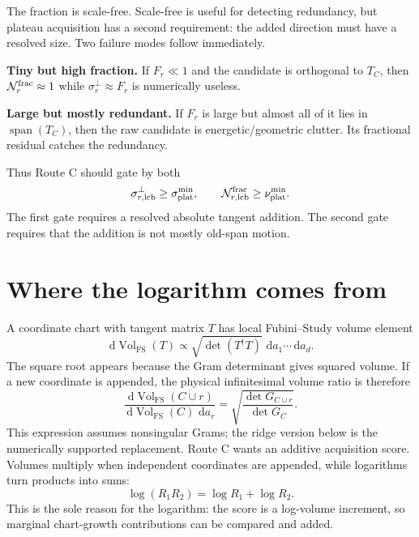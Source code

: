 \documentclass[10pt,twocolumn]{article}
\newcommand{\Span}{\operatorname{span}}
\newcommand{\lcb}{\mathrm{lcb}}
\newcommand{\plat}{\mathrm{plat}}
\newcommand{\FS}{\mathrm{FS}}
\newcommand{\dd}{\,\mathrm d}
\begin{document}
The fraction is scale-free. Scale-free is useful for detecting redundancy, but
plateau acquisition has a second requirement: the added direction must have a
resolved size. Two failure modes follow immediately.

\textbf{Tiny but high fraction.} If $F_r\ll 1$ and the candidate is orthogonal to
$T_C$, then $\mathcal N_r^{\rm frac}\approx1$ while $\sigma_r^\perp\approx F_r$
is numerically useless.

\textbf{Large but mostly redundant.} If $F_r$ is large but almost all of it lies
in $\Span(T_C)$, then the raw candidate is energetic/geometric clutter. Its
fractional residual catches the redundancy.

Thus Route C should gate by both
\[
\sigma_{r,\lcb}^\perp\ge\sigma_{\plat}^{\min},
\qquad
\mathcal N_{r,\lcb}^{\rm frac}\ge\nu_{\plat}^{\min}.
\]
The first gate requires a resolved absolute tangent addition. The second gate
requires that the addition is not mostly old-span motion.

\section{Where the logarithm comes from}

A coordinate chart with tangent matrix $T$ has local Fubini--Study volume element
\[
\dd\operatorname{Vol}_{\FS}(T)
\propto
\sqrt{\det(T^\dagger T)}\,\dd a_1\cdots \dd a_d.
\]
The square root appears because the Gram determinant gives squared volume. If a
new coordinate is appended, the physical infinitesimal volume ratio is therefore
\[
\frac{\dd\operatorname{Vol}_{\FS}(C\cup r)}
{\dd\operatorname{Vol}_{\FS}(C)\,\dd a_r}
=
\sqrt{
\frac{\det G_{C\cup r}}
{\det G_C}}.
\]
This expression assumes nonsingular Grams; the ridge version below is the
numerically supported replacement.
Route C wants an additive acquisition score. Volumes multiply when independent
coordinates are appended, while logarithms turn products into sums:
\[
\log(R_1R_2)=\log R_1+\log R_2.
\]
This is the sole reason for the logarithm: the score is a log-volume increment,
so marginal chart-growth contributions can be compared and added.
\end{document}
